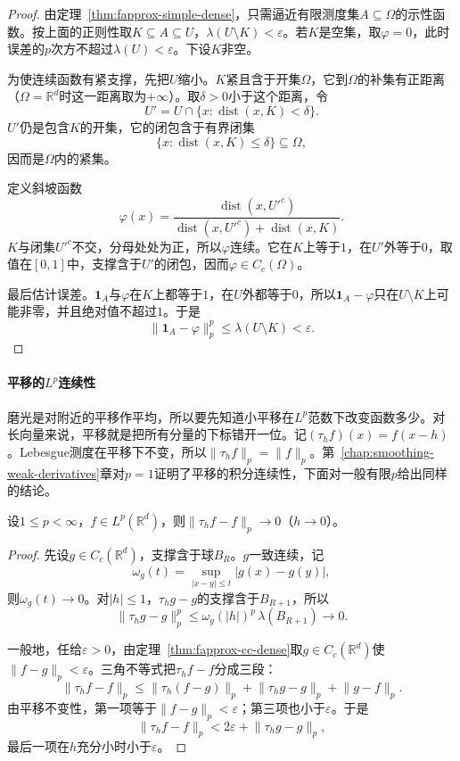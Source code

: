 \begin{proof}
由定理~\ref{thm:fapprox-simple-dense}，只需逼近有限测度集$A\subseteq\Omega$的示性函数。按上面的正则性取$K\subseteq A\subseteq U$，$\lambda(U\setminus K)<\varepsilon$。若$K$是空集，取$\varphi=0$，此时误差的$p$次方不超过$\lambda(U)<\varepsilon$。下设$K$非空。

为使连续函数有紧支撑，先把$U$缩小。$K$紧且含于开集$\Omega$，它到$\Omega$的补集有正距离（$\Omega=\mathbb R^d$时这一距离取为$+\infty$）。取$\delta>0$小于这个距离，令
\[
 U'=U\cap\{x:\operatorname{dist}(x,K)<\delta\}.
\]
$U'$仍是包含$K$的开集，它的闭包含于有界闭集
\[
 \{x:\operatorname{dist}(x,K)\leq\delta\}\subseteq\Omega ,
\]
因而是$\Omega$内的紧集。

定义斜坡函数
\[
 \varphi(x)=\frac{\operatorname{dist}(x,U'^c)}{\operatorname{dist}(x,U'^c)+\operatorname{dist}(x,K)} .
\]
$K$与闭集$U'^c$不交，分母处处为正，所以$\varphi$连续。它在$K$上等于$1$，在$U'$外等于$0$，取值在$[0,1]$中，支撑含于$U'$的闭包，因而$\varphi\in C_c(\Omega)$。

最后估计误差。$\mathbf 1_A$与$\varphi$在$K$上都等于$1$，在$U$外都等于$0$，所以$\mathbf 1_A-\varphi$只在$U\setminus K$上可能非零，并且绝对值不超过$1$。于是
\[
 \lVert\mathbf 1_A-\varphi\rVert_p^p\leq\lambda(U\setminus K)<\varepsilon .
\]
\end{proof}

\paragraph{平移的$L^p$连续性}
磨光是对附近的平移作平均，所以要先知道小平移在$L^p$范数下改变函数多少。对长向量来说，平移就是把所有分量的下标错开一位。记$(\tau_hf)(x)=f(x-h)$。Lebesgue测度在平移下不变，所以$\lVert\tau_hf\rVert_p=\lVert f\rVert_p$。第~\ref{chap:smoothing-weak-derivatives}章对$p=1$证明了平移的积分连续性，下面对一般有限$p$给出同样的结论。

\begin{theorem}
\label{thm:fapprox-translation}
设$1\leq p<\infty$，$f\in L^p(\mathbb R^d)$，则$\lVert\tau_hf-f\rVert_p\to0$（$h\to0$）。
\end{theorem}

\begin{proof}
先设$g\in C_c(\mathbb R^d)$，支撑含于球$B_R$。$g$一致连续，记
\[
 \omega_g(t)=\sup_{\lvert x-y\rvert\leq t}\lvert g(x)-g(y)\rvert ,
\]
则$\omega_g(t)\to0$。对$\lvert h\rvert\leq1$，$\tau_hg-g$的支撑含于$B_{R+1}$，所以
\[
 \lVert\tau_hg-g\rVert_p^p\leq\omega_g(\lvert h\rvert)^p\,\lambda(B_{R+1})\to0 .
\]

一般地，任给$\varepsilon>0$，由定理~\ref{thm:fapprox-cc-dense}取$g\in C_c(\mathbb R^d)$使$\lVert f-g\rVert_p<\varepsilon$。三角不等式把$\tau_hf-f$分成三段：
\[
 \lVert\tau_hf-f\rVert_p\leq\lVert\tau_h(f-g)\rVert_p+\lVert\tau_hg-g\rVert_p+\lVert g-f\rVert_p .
\]
由平移不变性，第一项等于$\lVert f-g\rVert_p<\varepsilon$；第三项也小于$\varepsilon$。于是
\[
 \lVert\tau_hf-f\rVert_p<2\varepsilon+\lVert\tau_hg-g\rVert_p ,
\]
最后一项在$h$充分小时小于$\varepsilon$。
\end{proof}

